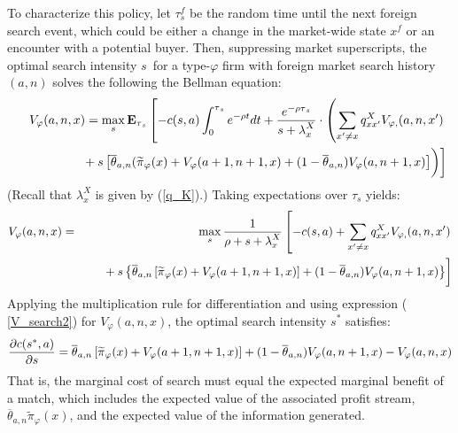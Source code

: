 \documentclass[12pt,titlepage]{article}
\begin{document}
To characterize this policy, let $\tau _{s}^{f}$ be the random time until
the next foreign search event, which could be either a change in the
market-wide state $x^{f}$ or an encounter with a potential buyer. Then,
suppressing market superscripts, the optimal search intensity $s$\ for a
type-$\varphi $ firm with foreign market search history $(a,n)$ solves the
following the Bellman equation:%
\begin{eqnarray*}
&&V_{\varphi }(a,n,x)=\max_{s}\mathbf{E}_{\tau _{s}}\left[
-c(s,a)\int_{0}^{\tau _{s}}e^{-\rho t}dt+\frac{e^{-\rho \tau _{s}}}{%
s+\lambda _{x}^{X}}\cdot \left( \sum_{x^{\prime }\neq x}q_{xx^{\prime
}}^{X}V_{\varphi ,}(a,n,x^{\prime })\right. \right. \\
\; &&\left. \left. 
\begin{array}{c}
\; \\ 
\;%
\end{array}%
+s\left[ \overline{\theta }_{a,n}(\widetilde{\pi }_{\varphi }(x)+V_{\varphi
}(a+1,n+1,x)+(1-\overline{\theta }_{a,n})V_{\varphi }(a,n+1,x)\right]
\right) \right]
\end{eqnarray*}%
(Recall that $\lambda _{x}^{X}$ is given by (\ref{q_K}).) Taking
expectations over $\tau _{s}$ yields:%
\begin{eqnarray}
V_{\varphi }(a,n,x) &=&\max_{s}\frac{1}{\rho +s+\lambda _{x}^{X}}\left[
-c(s,a)+\sum_{x^{\prime }\neq x}q_{xx^{\prime }}^{X}V_{\varphi
,}(a,n,x^{\prime })\right.  \label{V_search2} \\
&&\left. 
\begin{array}{c}
\; \\ 
\;%
\end{array}%
+s\left\{ \overline{\theta }_{a,n}\left[ \widetilde{\pi }_{\varphi
}(x)+V_{\varphi }(a+1,n+1,x)\right] +(1-\overline{\theta }_{a,n})V_{\varphi
}(a,n+1,x)\right\} \right]  \notag
\end{eqnarray}%
Applying the multiplication rule for differentiation and using expression (%
\ref{V_search2}) for $V_{\varphi }(a,n,x)$, the optimal search intensity $%
s^{\ast }$ satisfies:%
\begin{equation}
\frac{\partial c(s^{\ast },a)}{\partial s}=\overline{\theta }_{a,n}\left[ 
\widetilde{\pi }_{\varphi }(x)+V_{\varphi }(a+1,n+1,x)\right] +(1-\overline{%
\theta }_{a,n})V_{\varphi }(a,n+1,x)-V_{\varphi }(a,n,x)
\label{FOC_MS_learning}
\end{equation}%
That is, the marginal cost of search must equal the expected marginal
benefit of a match, which includes the expected value of the associated
profit stream, $\overline{\theta }_{a,n}\widetilde{\pi }_{\varphi }(x)$, and
the expected value of the information generated.
\end{document}
